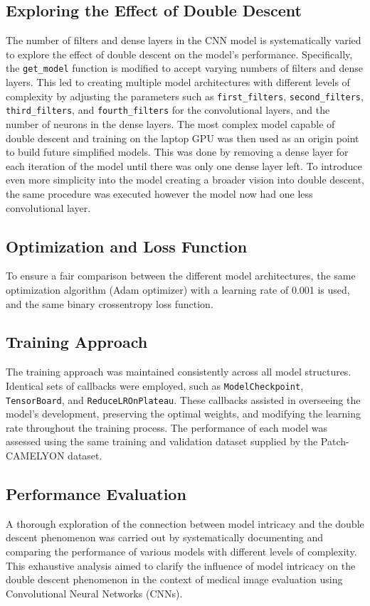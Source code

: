 \subsection{Exploring the Effect of Double Descent}
The number of filters and dense layers in the CNN model is systematically varied to explore the effect of double descent on the model's performance. Specifically, the \texttt{get\_model} function is modified to accept varying numbers of filters and dense layers. This led to creating multiple model architectures with different levels of complexity by adjusting the parameters such as \texttt{first\_filters}, \texttt{second\_filters}, \texttt{third\_filters}, and \texttt{fourth\_filters} for the convolutional layers, and the number of neurons in the dense layers. The most complex model capable of double descent and training on the laptop GPU was then used as an origin point to build future simplified models. This was done by removing a dense layer for each iteration of the model until there was only one dense layer left. To introduce even more simplicity into the model creating a broader vision into double descent, the same procedure was executed however the model now had one less convolutional layer.

\subsection{Optimization and Loss Function}
To ensure a fair comparison between the different model architectures, the same optimization algorithm (Adam optimizer) with a learning rate of 0.001 is used, and the same binary crossentropy loss function.

\subsection{Training Approach}
The training approach was maintained consistently across all model structures. Identical sets of callbacks were employed, such as \texttt{ModelCheckpoint}, \texttt{TensorBoard}, and \texttt{ReduceLROnPlateau}. These callbacks assisted in overseeing the model's development, preserving the optimal weights, and modifying the learning rate throughout the training process. The performance of each model was assessed using the same training and validation dataset supplied by the Patch-CAMELYON dataset.

\subsection{Performance Evaluation}
A thorough exploration of the connection between model intricacy and the double descent phenomenon was carried out by systematically documenting and comparing the performance of various models with different levels of complexity. This exhaustive analysis aimed to clarify the influence of model intricacy on the double descent phenomenon in the context of medical image evaluation using Convolutional Neural Networks (CNNs).

